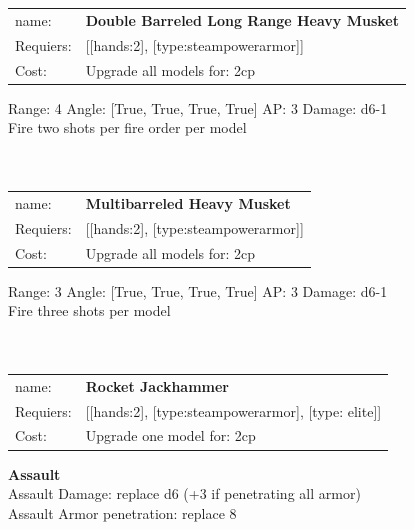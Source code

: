 \ \\
\ \\
\begin{tabular}{ll}
name: & {\bf Double Barreled Long Range Heavy Musket } \\
Requiers: & [[hands:2], [type:steampowerarmor]] \\
Cost: & Upgrade all models for: 2cp \\
\end{tabular}



Range: 4  Angle: [True, True, True, True] AP: 3 Damage: d6-1 \\
Fire two shots per fire order per model\\ 








\ \\
\ \\
\begin{tabular}{ll}
name: & {\bf Multibarreled Heavy Musket } \\
Requiers: & [[hands:2], [type:steampowerarmor]] \\
Cost: & Upgrade all models for: 2cp \\
\end{tabular}



Range: 3  Angle: [True, True, True, True] AP: 3 Damage: d6-1 \\
Fire three shots per model\\ 








\ \\
\ \\
\begin{tabular}{ll}
name: & {\bf Rocket Jackhammer } \\
Requiers: & [[hands:2], [type:steampowerarmor], [type: elite]] \\
Cost: & Upgrade one model for: 2cp \\
\end{tabular}





{\bf Assault} \ \\
Assault Damage: replace d6 (+3 if penetrating all armor)
\\ 
Assault Armor penetration: replace 8 
\\ 




